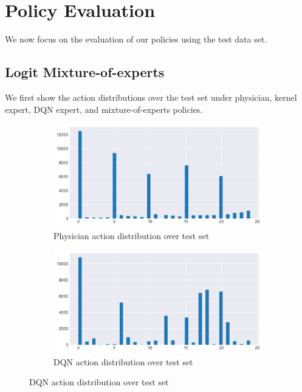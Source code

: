 \documentclass[letterpaper]{article}
\begin{document}
\section{Policy Evaluation}

We now focus on the evaluation of our policies using the test data set.

\subsection{Logit Mixture-of-experts}
\label{section:dqn_policy}
We first show the action distributions over the test set under physician, kernel expert, DQN expert, and mixture-of-experts policies. 

\begin{figure}[H]
  \centering
  \begin{subfigure}{0.5\linewidth}
  \centering
  \includegraphics[width=0.9\linewidth]{figures/phy_test_a_hist.png}\hfill
  \caption{Physician action distribution over test set}
  \label{fig:phy_test_a_hist}
  \end{subfigure}%
  \begin{subfigure}{0.5\linewidth}
  \centering
  \includegraphics[width=0.9\linewidth]{figures/agent_test_a_hist.png}\hfill
  \caption{DQN action distribution over test set}
  \label{fig:agent_test_a_hist}
  \end{subfigure}

\end{figure}
\end{document}
